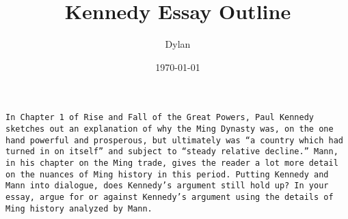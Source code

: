 \documentclass[letterpaper]{article}
\author{Dylan}
\date{\today}
\title{Kennedy Essay Outline}
\renewcommand\maketitle{}
\begin{document}
\maketitle
\begin{verbatim}
In Chapter 1 of Rise and Fall of the Great Powers, Paul Kennedy sketches out an explanation of why the Ming Dynasty was, on the one hand powerful and prosperous, but ultimately was “a country which had turned in on itself” and subject to “steady relative decline.” Mann, in his chapter on the Ming trade, gives the reader a lot more detail on the nuances of Ming history in this period. Putting Kennedy and Mann into dialogue, does Kennedy’s argument still hold up? In your essay, argue for or against Kennedy’s argument using the details of Ming history analyzed by Mann.
\end{verbatim}
\end{document}
